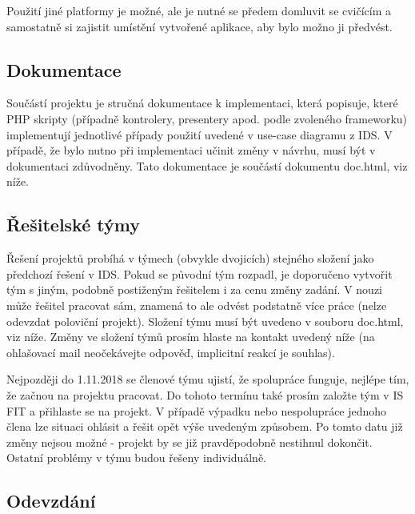 \documentclass[11pt, a4paper, titlepage]{article}
\begin{document}
Použití jiné platformy je možné, ale je nutné se předem domluvit se cvičícím a samostatně si zajistit umístění vytvořené aplikace, aby bylo možno ji předvést.


\subsection*{Dokumentace}

Součástí projektu je stručná dokumentace k implementaci, která popisuje, které PHP skripty (případně kontrolery, presentery apod. podle zvoleného frameworku) implementují jednotlivé případy použití uvedené v use-case diagramu z IDS. V případě, že bylo nutno při implementaci učinit změny v návrhu, musí být v dokumentaci zdůvodněny. Tato dokumentace je součástí dokumentu doc.html, viz níže.


\subsection*{Řešitelské týmy}

Řešení projektů probíhá v týmech (obvykle dvojicích) stejného složení jako předchozí řešení v IDS. Pokud se původní tým rozpadl, je doporučeno vytvořit tým s jiným, podobně postiženým řešitelem i za cenu změny zadání. V nouzi může řešitel pracovat sám, znamená to ale odvést podstatně více práce (nelze odevzdat poloviční projekt). Složení týmu musí být uvedeno v souboru doc.html, viz níže. Změny ve složení týmů prosím hlaste na kontakt uvedený níže (na ohlašovací mail neočekávejte odpověď, implicitní reakcí je souhlas).

Nejpozději do 1.11.2018 se členové týmu ujistí, že spolupráce funguje, nejlépe tím, že začnou na projektu pracovat. Do tohoto termínu také prosím založte tým v IS FIT a přihlaste se na projekt. V případě výpadku nebo nespolupráce jednoho člena lze situaci ohlásit a řešit opět výše uvedeným způsobem. Po tomto datu již změny nejsou možné - projekt by se již pravděpodobně nestihnul dokončit. Ostatní problémy v týmu budou řešeny individuálně.


\subsection*{Odevzdání}
\end{document}
